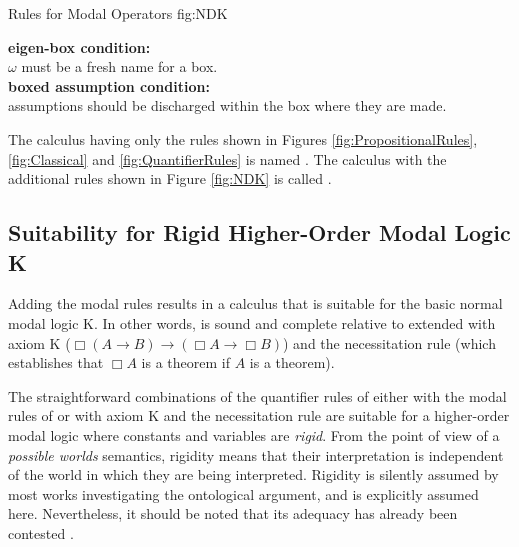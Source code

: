 \documentclass{llncs}
\newcommand{\imp}{\rightarrow}
\newcommand{\nec}{\Box} %
\newcommand{\pos}{\Diamond} %
\begin{document}
\begin{calculus}
{Rules for Modal Operators}
{fig:NDK}

\vspace{1em}

\s\s\s\s
\infer[\nec_I]{\nec A}{\omega: \fbox{\infer*{A}{}} }
\s\s\s\s
\infer[\nec_E]{w: \fbox{ \infer*{}{A} } }{\nec A}



\vspace{1em}

\begin{center}
\textbf{eigen-box condition:}\\ 
$\omega$ must be a fresh name for a box. \\
\vspace{0.5em}
\textbf{boxed assumption condition:} \\
assumptions should be discharged within the box where they are made.
\end{center}

\vspace{1em}

\end{calculus}


\noindent
The calculus having only the rules shown in Figures \ref{fig:PropositionalRules}, \ref{fig:Classical} and \ref{fig:QuantifierRules} is named \ND. The calculus with the additional rules shown in Figure \ref{fig:NDK} is called \NDK.


\subsection{Suitability for Rigid Higher-Order Modal Logic K}

Adding the modal rules results in a calculus that is suitable for the basic normal modal logic K.
In other words, {\NDK} is sound and complete relative to {\ND} extended with axiom K ($\nec(A\imp B)\imp (\nec A\imp \nec B)$) and the necessitation rule (which establishes that $\nec A$ is a theorem if $A$ is a theorem).

The straightforward combinations of the quantifier rules of {\ND} either with the modal rules of {\NDK} or with axiom K and the necessitation rule are suitable for a higher-order modal logic where constants and variables are \emph{rigid}. From the point of view of a \emph{possible worlds} semantics, rigidity means that their interpretation is independent of the world in which they are being interpreted. Rigidity is silently assumed by most works investigating the ontological argument, and is explicitly assumed here. Nevertheless, it should be noted that its adequacy has already been contested \cite{fitting}.
\end{document}
